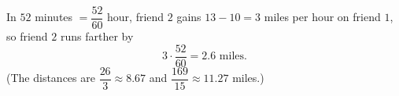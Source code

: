 In $52$ minutes $=\dfrac{52}{60}$ hour, friend $2$ gains $13-10=3$ miles per hour on friend $1$, so friend $2$ runs farther by
\[3\cdot\dfrac{52}{60}=\boxed{2.6\text{ miles}}.\]
(The distances are $\dfrac{26}{3}\approx8.67$ and $\dfrac{169}{15}\approx11.27$ miles.)
